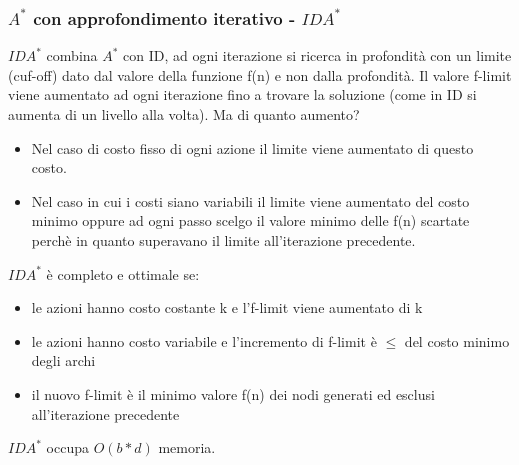 \documentclass{article}
\begin{document}
\subsubsection{$A^*$ con approfondimento iterativo - $IDA^*$}
$IDA^*$ combina $A^*$ con ID, ad ogni iterazione si ricerca in profondità con un limite (cuf-off) dato dal valore della funzione f(n) e non dalla profondità. Il valore f-limit viene aumentato ad ogni iterazione fino a trovare la soluzione (come in ID si aumenta di un livello alla volta). Ma di quanto aumento? 
\begin{itemize}
    \item Nel caso di costo fisso di ogni azione il limite viene aumentato di questo costo.
    \item Nel caso in cui i costi siano variabili il limite viene aumentato del costo minimo oppure ad ogni passo scelgo il valore minimo delle f(n) scartate perchè in quanto superavano il limite all'iterazione precedente.
\end{itemize}
$IDA^*$ è completo e ottimale se:
\begin{itemize}
    \item le azioni hanno costo costante k e l'f-limit viene aumentato di k
    \item le azioni hanno costo variabile e l'incremento di f-limit è $\leq$ del costo minimo degli archi
    \item il nuovo f-limit è il minimo valore f(n) dei nodi generati ed esclusi all'iterazione precedente
\end{itemize}
$IDA^*$ occupa $O(b*d)$ memoria.
\clearpage
\end{document}
